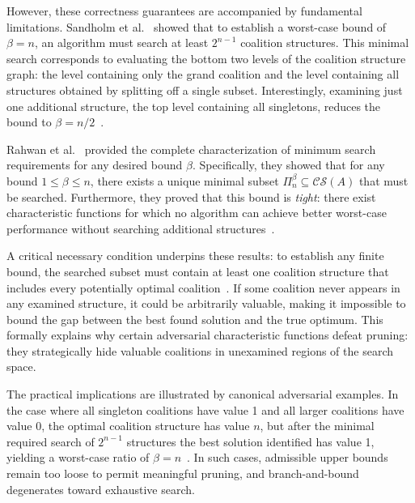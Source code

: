 \documentclass{article}
\begin{document}
However, these correctness guarantees are accompanied by fundamental limitations. Sandholm et al.~\cite{sandholm1999coalition} showed that to establish a worst-case bound of $\beta = n$, an algorithm must search at least $2^{n-1}$ coalition structures. This minimal search corresponds to evaluating the bottom two levels of the coalition structure graph: the level containing only the grand coalition and the level containing all structures obtained by splitting off a single subset. Interestingly, examining just one additional structure, the top level containing all singletons, reduces the bound to $\beta = n/2$~\cite{sandholm1999coalition}.

Rahwan et al.~\cite{rahwan2011minimum} provided the complete characterization of minimum search requirements for any desired bound $\beta$. Specifically, they showed that for any bound $1 \leq \beta \leq n$, there exists a unique minimal subset $\Pi^{\beta}_n \subseteq \mathcal{CS}(A)$ that must be searched. Furthermore, they proved that this bound is \emph{tight}: there exist characteristic functions for which no algorithm can achieve better worst-case performance without searching additional structures~\cite{rahwan2011minimum}.

A critical necessary condition underpins these results: to establish any finite bound, the searched subset must contain at least one coalition structure that includes every potentially optimal coalition~\cite{rahwan2011minimum}. If some coalition never appears in any examined structure, it could be arbitrarily valuable, making it impossible to bound the gap between the best found solution and the true optimum. This formally explains why certain adversarial characteristic functions defeat pruning: they strategically hide valuable coalitions in unexamined regions of the search space.

The practical implications are illustrated by canonical adversarial examples. In the case where all singleton coalitions have value 1 and all larger coalitions have value 0, the optimal coalition structure has value $n$, but after the minimal required search of $2^{n-1}$ structures the best solution identified has value 1, yielding a worst-case ratio of $\beta = n$~\cite{sandholm1999coalition}. In such cases, admissible upper bounds remain too loose to permit meaningful pruning, and branch-and-bound degenerates toward exhaustive search.
\end{document}
